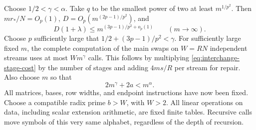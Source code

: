 Choose $1/2<\gamma<\alpha$. Take $q$ to be the smallest power of two
at least $m^{1/p^2}$. Then $m r_*/N=O_p(1)$,
$D=O_p(m^{(2p-1)/p^2})$, and
\[
       D(1+\lambda)\le m^{(3p-1)/p^2+o_p(1)}
          \qquad (m\longrightarrow\infty).
\]
Choose $p$ sufficiently large that $1/2+(3p-1)/p^2<\gamma$.
For sufficiently large fixed $m$, the complete computation of the
main swaps on $W=RN$ independent streams uses at most $Wm^\gamma$
calls. This follows by multiplying \eqref{eq:interchange-stage-cost}
by the number of stages and adding $4ms/R$ per stream for repair.
Also choose $m$ so that
\begin{equation}\label{eq:interchange-contraction}
                         2m^\gamma+2a<m^\alpha .
\end{equation}
All matrices, bases, row widths, and endpoint instructions have now
been fixed. Choose a compatible radix prime $b>W$, with $W>2$.
All linear operations on data, including scalar extension arithmetic,
are fixed finite tables. Recursive calls move symbols of this very
same alphabet, regardless of the depth of recursion.


